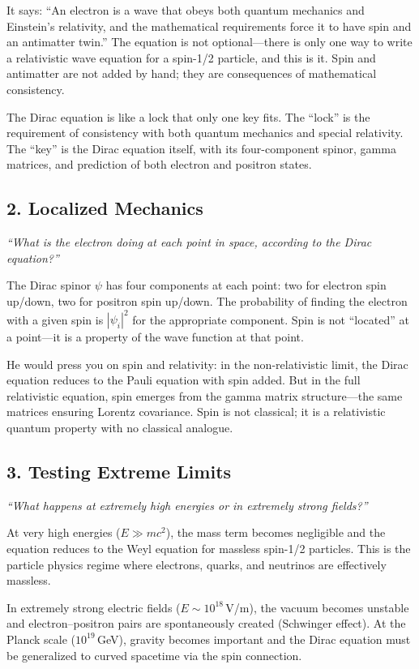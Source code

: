 \documentclass[11pt,openright]{book}
\begin{document}
It says: ``An electron is a wave that obeys both quantum mechanics and Einstein's relativity, and the mathematical requirements force it to have spin and an antimatter twin.'' The equation is not optional---there is only one way to write a relativistic wave equation for a spin-1/2 particle, and this is it. Spin and antimatter are not added by hand; they are consequences of mathematical consistency.

The Dirac equation is like a lock that only one key fits. The ``lock'' is the requirement of consistency with both quantum mechanics and special relativity. The ``key'' is the Dirac equation itself, with its four-component spinor, gamma matrices, and prediction of both electron and positron states.

\subsection*{2. Localized Mechanics}
\textit{``What is the electron doing at each point in space, according to the Dirac equation?''}

The Dirac spinor $\psi$ has four components at each point: two for electron spin up/down, two for positron spin up/down. The probability of finding the electron with a given spin is $|\psi_i|^2$ for the appropriate component. Spin is not ``located'' at a point---it is a property of the wave function at that point.

He would press you on spin and relativity: in the non-relativistic limit, the Dirac equation reduces to the Pauli equation with spin added. But in the full relativistic equation, spin emerges from the gamma matrix structure---the same matrices ensuring Lorentz covariance. Spin is not classical; it is a relativistic quantum property with no classical analogue.

\subsection*{3. Testing Extreme Limits}
\textit{``What happens at extremely high energies or in extremely strong fields?''}

At very high energies ($E \gg mc^2$), the mass term becomes negligible and the equation reduces to the Weyl equation for massless spin-1/2 particles. This is the particle physics regime where electrons, quarks, and neutrinos are effectively massless.

In extremely strong electric fields ($E \sim 10^{18}$\,V/m), the vacuum becomes unstable and electron--positron pairs are spontaneously created (Schwinger effect). At the Planck scale ($10^{19}$\,GeV), gravity becomes important and the Dirac equation must be generalized to curved spacetime via the spin connection.
\end{document}
